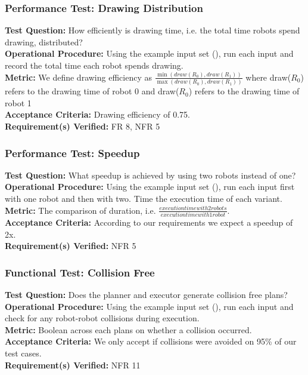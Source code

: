 \subsubsection{Performance Test: Drawing Distribution}
\label{test:sdp_pt_draw}
\textbf{Test Question:} How efficiently is drawing time, i.e. the total time robots spend drawing, distributed? \\
\textbf{Operational Procedure:} Using the example input set (), run each input and record the total time each robot spends drawing. \\
\textbf{Metric:} We define drawing efficiency as $\frac{\min(draw(R_{0}), draw(R_{1}))}{\max(draw(R_{0}), draw(R_{1}))}$ where draw($R_{0}$) refers to the drawing time of robot 0 and draw($R_{0}$) refers to the drawing time of robot 1\\
\textbf{Acceptance Criteria:} Drawing efficiency of 0.75.\\
\textbf{Requirement(s) Verified:} FR 8, NFR 5

\subsubsection{Performance Test: Speedup}
\label{test:sdp_pt_speedup}
\textbf{Test Question:} What speedup is achieved by using two robots instead of one?\\
\textbf{Operational Procedure:} Using the example input set (), run each input first with one robot and then with two. Time the execution time of each variant.\\
\textbf{Metric:} The comparison of duration, i.e. $\frac{execution time with 2 robots}{execution time with 1 robot}$. \\
\textbf{Acceptance Criteria:} According to our requirements we expect a speedup of 2x. \\
\textbf{Requirement(s) Verified:} NFR 5

\subsubsection{Functional Test: Collision Free}
\label{test:sdp_ft_collision}
\textbf{Test Question:} Does the planner and executor generate collision free plans?\\
\textbf{Operational Procedure:} Using the example input set (), run each input and check for any robot-robot collisions during execution. \\
\textbf{Metric:} Boolean across each plans on whether a collision occurred.\\
\textbf{Acceptance Criteria:} We only accept if collisions were avoided on 95\% of our test cases. \\
\textbf{Requirement(s) Verified:} NFR 11

